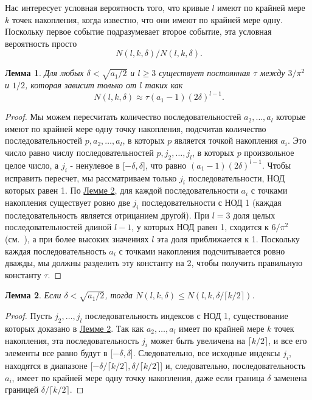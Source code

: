 \documentclass[a4paper,12pt]{report}
\newtheorem{Лемма}{Лемма}
\begin{document}
Нас интересует условная вероятность того, что кривые $l$ имеют по крайней мере $k$ точек накопления, когда известно, что они имеют по крайней мере одну. Поскольку первое событие подразумевает второе событие, эта условная вероятность просто
\[
\ N(l, k, \delta) / N(l, k, \delta).
\]

\begin{Лемма}
Для любых $\delta < \sqrt{a_1/2}$ и $l \geq 3$ существует постоянная $\tau$ между $3 / \pi^2$ и $1 / 2$, которая зависит только от $l$ таких как
\[
\ N(l, k, \delta) \approx \tau(a_1 - 1)(2\delta)^{l - 1}.
\]
\end{Лемма}

\begin{proof}
Мы можем пересчитать количество последовательностей $a_2, \ldots, a_l$ которые имеют по крайней мере одну точку накопления, подсчитав количество последовательностей $p, a_2, \ldots, a_l$, в которых $p$ является точкой накопления $a_i$. Это число равно числу последовательностей $p, j_2, \ldots, j_l$, в которых $p$ произвольное целое число, а $j_i$ - ненулевое в [$-\delta, \delta$], что равно $(a_1 - 1)(2\delta)^{l - 1}$. Чтобы исправить пересчет, мы рассматриваем только $j_i$ последовательности, НОД которых равен 1. По \hyperlink{лемма2}{Лемме 2}, для каждой последовательности $a_i$ с точками накопления существует ровно две $j_i$ последовательности с НОД 1 (каждая последовательность является отрицанием другой). При $l = 3$ доля целых последовательностей длиной $l - 1$, у которых НОД равен 1, сходится к $6/\pi^2$ (см.~\cite{knuth}), а при более высоких значениях $l$ эта доля приближается к 1. Поскольку каждая последовательность $a_i$ с точками накопления подсчитывается ровно дважды, мы должны разделить эту константу на 2, чтобы получить правильную константу $\tau$.
\end{proof}

\begin{Лемма}
Если $\delta < \sqrt{a_1/2}$, тогда $N(l,k,\delta) \leq N(l,k,\delta / \lceil k / 2 \rceil)$.
\end{Лемма}

\begin{proof}
Пусть $j_2, \ldots, j_l$ последовательность индексов с НОД 1, существование которых доказано в \hyperlink{лемма2}{Лемме 2}. Так как $a_2, \ldots, a_l$ имеет по крайней мере $k$ точек накопления, эта последовательность $j_i$  может быть увеличена на $\lceil k / 2 \rceil$, и все его элементы все равно будут в [$-\delta,\delta$]. Следовательно, все исходные индексы $j_i$, находятся в диапазоне [$-\delta / \lceil k / 2 \rceil, \delta /  \lceil k / 2 \rceil$] и, следовательно, последовательность $a_i$, имеет по крайней мере одну точку накопления, даже если граница $\delta$ заменена границей $\delta / \lceil k / 2 \rceil$.
\end{proof}
\end{document}

